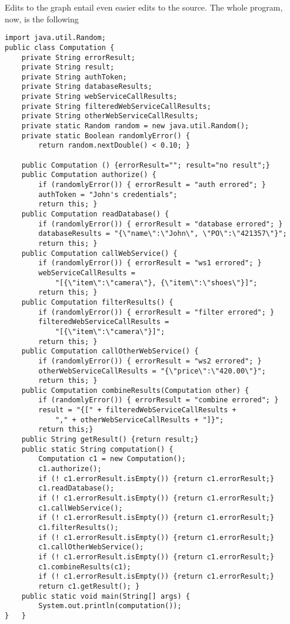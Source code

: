 \documentclass[11pt]{article}
\begin{document}
Edits to the graph entail even easier edits to the source. The whole
program, now, is the following

\begin{verbatim}
import java.util.Random;
public class Computation {
    private String errorResult;
    private String result;
    private String authToken;
    private String databaseResults;
    private String webServiceCallResults;
    private String filteredWebServiceCallResults;
    private String otherWebServiceCallResults;
    private static Random random = new java.util.Random();
    private static Boolean randomlyError() {
        return random.nextDouble() < 0.10; }

    public Computation () {errorResult=""; result="no result";}
    public Computation authorize() {
        if (randomlyError()) { errorResult = "auth errored"; }
        authToken = "John's credentials";
        return this; }
    public Computation readDatabase() {
        if (randomlyError()) { errorResult = "database errored"; }
        databaseResults = "{\"name\":\"John\", \"PO\":\"421357\"}";
        return this; }
    public Computation callWebService() {
        if (randomlyError()) { errorResult = "ws1 errored"; }
        webServiceCallResults =
            "[{\"item\":\"camera\"}, {\"item\":\"shoes\"}]";
        return this; }
    public Computation filterResults() {
        if (randomlyError()) { errorResult = "filter errored"; }
        filteredWebServiceCallResults =
            "[{\"item\":\"camera\"}]";
        return this; }
    public Computation callOtherWebService() {
        if (randomlyError()) { errorResult = "ws2 errored"; }
        otherWebServiceCallResults = "{\"price\":\"420.00\"}";
        return this; }
    public Computation combineResults(Computation other) {
        if (randomlyError()) { errorResult = "combine errored"; }
        result = "{[" + filteredWebServiceCallResults +
            "," + otherWebServiceCallResults + "]}"; 
        return this;}
    public String getResult() {return result;}
    public static String computation() {
        Computation c1 = new Computation();
        c1.authorize();
        if (! c1.errorResult.isEmpty()) {return c1.errorResult;}
        c1.readDatabase();
        if (! c1.errorResult.isEmpty()) {return c1.errorResult;}
        c1.callWebService();
        if (! c1.errorResult.isEmpty()) {return c1.errorResult;}
        c1.filterResults();
        if (! c1.errorResult.isEmpty()) {return c1.errorResult;}
        c1.callOtherWebService();
        if (! c1.errorResult.isEmpty()) {return c1.errorResult;}
        c1.combineResults(c1);
        if (! c1.errorResult.isEmpty()) {return c1.errorResult;}
        return c1.getResult(); }
    public static void main(String[] args) {
        System.out.println(computation());
}   }
\end{verbatim}
\end{document}
